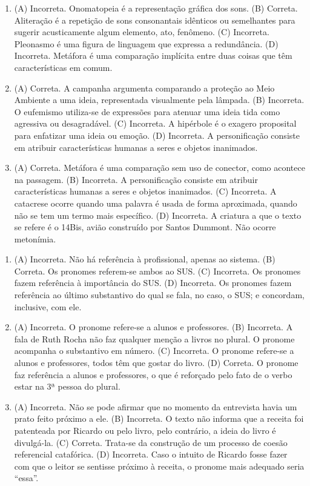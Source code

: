 \begin{enumerate}
\item (A) Incorreta. Onomatopeia é a representação gráfica dos sons.
(B) Correta. Aliteração é a repetição de sons consonantais idênticos ou
semelhantes para sugerir acusticamente algum elemento, ato, fenômeno.
(C) Incorreta. Pleonasmo é uma figura de linguagem que expressa a
redundância.
(D) Incorreta. Metáfora é uma comparação implícita entre duas coisas que
têm características em comum.

\item (A) Correta. A campanha argumenta comparando a proteção ao Meio Ambiente
a uma ideia, representada visualmente pela lâmpada.
(B) Incorreta. O eufemismo utiliza-se de expressões para atenuar uma
ideia tida como agressiva ou desagradável.
(C) Incorreta. A hipérbole é o exagero proposital para enfatizar uma
ideia ou emoção.
(D) Incorreta. A personificação consiste em atribuir características
humanas a seres e objetos inanimados.

\item (A) Correta. Metáfora é uma comparação sem uso de conector, como acontece
na passagem.
(B) Incorreta. A personificação consiste em atribuir características
humanas a seres e objetos inanimados.
(C) Incorreta. A catacrese ocorre quando uma palavra é usada de forma
aproximada, quando não se tem um termo mais específico.
(D) Incorreta. A criatura a que o texto se refere é o 14Bis, avião
construído por Santos Dummont. Não ocorre metonímia.
\end{enumerate}


\begin{enumerate}
\item (A) Incorreta. Não há referência à profissional, apenas ao sistema.
(B) Correta. Os pronomes referem-se ambos ao SUS.
(C) Incorreta. Os pronomes fazem referência à importância do SUS.
(D) Incorreta. Os pronomes fazem referência ao último substantivo do qual
se fala, no caso, o SUS; e concordam, inclusive, com ele.

\item (A) Incorreta. O pronome refere-se a alunos e professores.
(B) Incorreta. A fala de Ruth Rocha não faz qualquer menção a livros no
plural. O pronome acompanha o substantivo em número.
(C) Incorreta. O pronome refere-se a alunos e professores, todos têm que
gostar do livro.
(D) Correta. O pronome faz referência a alunos e professores, o que é
reforçado pelo fato de o verbo estar na 3ª pessoa do plural.

\item (A) Incorreta. Não se pode afirmar que no momento da entrevista havia um
prato feito próximo a ele.
(B) Incorreta. O texto não informa que a receita foi patenteada por
Ricardo ou pelo livro, pelo contrário, a ideia do livro é divulgá-la.
(C) Correta. Trata-se da construção de um processo de coesão referencial
catafórica.
(D) Incorreta. Caso o intuito de Ricardo fosse fazer com que o leitor se
sentisse próximo à receita, o pronome mais adequado seria ``essa''.
\end{enumerate}

